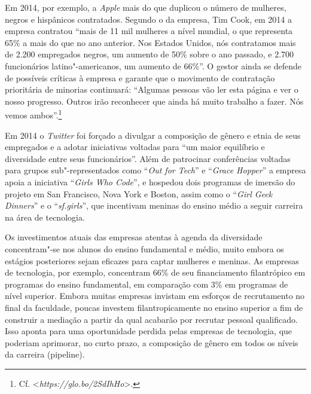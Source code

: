 Em 2014, por exemplo, a \emph{Apple} mais do que duplicou o número de
mulheres, negros e hispânicos contratados. Segundo o  da empresa, Tim
Cook, em 2014 a empresa contratou ``mais de 11 mil mulheres a nível
mundial, o que representa 65\% a mais do que no ano anterior. Nos
Estados Unidos, nós contratamos mais de 2.200 empregados negros, um
aumento de 50\% sobre o ano passado, e 2.700 funcionários
latino"-americanos, um aumento de 66\%''. O gestor ainda se defende de
possíveis críticas à empresa e garante que o movimento de contratação
prioritária de minorias continuará: ``Algumas pessoas vão ler esta
página e ver o nosso progresso. Outros irão reconhecer que ainda há
muito trabalho a fazer. Nós vemos ambos''.\footnote{Cf.
  \textless{}\emph{https://glo.bo/2SdIhHo}\textgreater{}.}

Em 2014 o \emph{Twitter} foi forçado a divulgar a composição de gênero e
etnia de seus empregados e a adotar iniciativas voltadas para ``um maior
equilíbrio e diversidade entre seus funcionários''. Além de patrocinar
conferências voltadas para grupos sub"-representados como ``\emph{Out for
Tech}'' e ``\emph{Grace Hopper}'' a empresa apoia a iniciativa
``\emph{Girls Who Code}'', e hospedou dois programas de imersão do
projeto em San Francisco, Nova York e Boston, assim como o ``\emph{Girl
Geek Dinners}'' e o ``\emph{sf.girls}'', que incentivam meninas do
ensino médio a seguir carreira na área de tecnologia.

Os investimentos atuais das empresas atentas à agenda da diversidade
concentram"-se nos alunos do ensino fundamental e médio, muito embora os
estágios posteriores sejam eficazes para captar mulheres e meninas. As
empresas de tecnologia, por exemplo, concentram 66\% de seu
financiamento filantrópico em programas do ensino fundamental, em
comparação com 3\% em programas de nível superior. Embora muitas
empresas invistam em esforços de recrutamento no final da faculdade,
poucas investem filantropicamente no ensino superior a fim de construir
a mediação a partir da qual acabarão por recrutar pessoal qualificado.
Isso aponta para uma oportunidade perdida pelas empresas de tecnologia,
que poderiam aprimorar, no curto prazo, a composição de gênero em todos
os níveis da carreira (pipeline).

